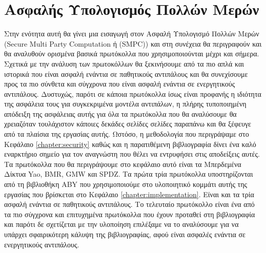 \chapter{Ασφαλής Υπολογισμός Πολλών Μερών}
\label{chapter:SMPC}

Στην ενότητα αυτή θα γίνει μια εισαγωγή στον Ασφαλή Υπολογισμό Πολλών Μερών (Secure Multi Party Computation ή (SMPC)) και στη συνέχεια θα περιγραφούν και θα αναλυθούν ορισμένα βασικά πρωτόκολλα που χρησιμοποιούνται μέχρι και σήμερα. Σχετικά με την ανάλυση των πρωτοκόλλων θα ξεκινήσουμε από τα πιο απλά και ιστορικά που είναι ασφαλή ενάντια σε παθητικούς αντιπάλους και θα συνεχίσουμε προς τα πιο σύνθετα και σύγχρονα που είναι ασφαλή ενάντια σε ενεργητικούς αντιπάλους. Δυστυχώς, παρότι σε κάποια πρωτόκολλα ίσως είναι προφανής η ιδιότητα της ασφάλεια τους για συγκεκριμένα μοντέλα αντιπάλων, η πλήρης τυποποιημένη απόδειξη της ασφάλειας αυτής για όλα τα πρωτόκολλα που θα αναλύσουμε θα χρειαζόταν τουλάχιστον κάποιες δεκάδες σελίδες σελίδες παραπάνω και θα ξέφευγε από τα πλαίσια της εργασίας αυτής. Ωστόσο, η μεθοδολογία που περιγράψαμε στο Κεφάλαιο \ref{chapter:security} καθώς και η παρατιθέμενη βιβλιογραφία δίνει ένα καλό εναρκτήριο σημείο για τον αναγνώστη που θέλει να εντρυφήσει στις αποδείξεις αυτές. Τα πρωτόκολλα που θα περιγράψουμε στο κεφάλαιο αυτό είναι τα Μπερδεμένα Δίκτυα Yao, BMR, GMW και SPDZ. Τα πρώτα τρία πρωτόκολλα υποστηρίζονται από τη βιβλιοθήκη ABY που χρησιμοποιούμε στο υλοποιητικό κομμάτι αυτής της εργασίας που βρίσκεται στο Κεφάλαιο \ref{chapter:implementation}. Είναι και τα τρία ασφαλή ενάντια σε παθητικούς αντιπάλους. Το τελευταίο πρωτόκολλο είναι ένα από τα πιο σύγχρονα και επιτυχημένα πρωτόκολλα που έχουν προταθεί στη βιβλιογραφία και παρότι δε σχετίζεται με την υλοποίηση επιλέξαμε να το αναλύσουμε για να υπάρχει σφαιρικότερη κάλυψη της βιβλιογραφίας, αφού είναι ασφαλές ενάντια σε ενεργητικούς αντιπάλους.

